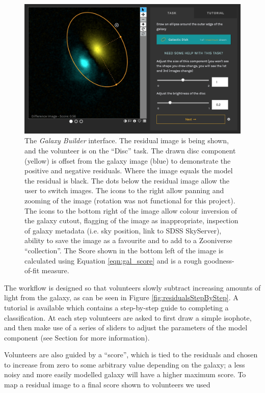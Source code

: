 \documentclass[../main.tex]{subfiles}
\begin{document}
\begin{figure}
  \includegraphics[width=17.7cm]{images/interfaceInProgress.jpg}
  \caption{The \textit{Galaxy Builder} interface. The residual image is being shown, and the volunteer is on the ``Disc'' task. The drawn disc component (yellow) is offset from the galaxy image (blue) to demonstrate the positive and negative residuals. Where the image equals the model the residual is black. The dots below the residual image allow the user to switch images. The icons to the right allow panning and zooming of the image (rotation was not functional for this project). The icons to the bottom right of the image allow colour inversion of the galaxy cutout, flagging of the image as inappropriate, inspection of galaxy metadata (i.e. sky position, link to SDSS SkyServer), ability to save the image as a favourite and to add to a Zooniverse ``collection''. The Score shown in the bottom left of the image is calculated using Equation \ref{eqn:gal_score} and is a rough goodness-of-fit measure.}
  \label{fig:interfaceInProgress}
\end{figure}


The workflow is designed so that volunteers slowly subtract increasing amounts of light from the galaxy, as can be seen in Figure \ref{fig:residualsStepByStep}. A tutorial is available which contains a step-by-step guide to completing a classification. At each step volunteers are asked to first draw a simple isophote, and then make use of a series of sliders to adjust the parameters of the model component (see Section \label{section:galaxy-model} for more information).

Volunteers are also guided by a ``score'', which is tied to the residuals and chosen to increase from zero to some arbitrary value depending on the galaxy; a less noisy and more easily modelled galaxy will have a higher maximum score. To map a residual image to a final score shown to volunteers we used
\end{document}
